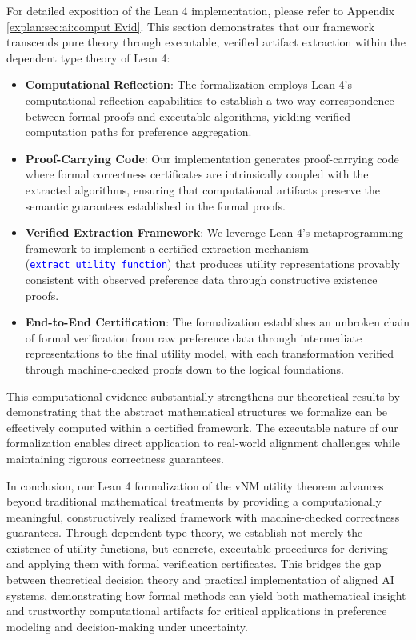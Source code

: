 \documentclass{article}
\theoremstyle{definition}
\newcommand{\tactic}[1]{\textcolor{blue}{\texttt{#1}}}
\begin{document}
For detailed exposition of the Lean 4 implementation, please refer to Appendix \ref{explan:sec:ai:comput Evid}. This section demonstrates that our framework transcends pure theory through executable, verified artifact extraction within the dependent type theory of Lean 4:

\begin{itemize}
  \item \textbf{Computational Reflection}: The formalization employs Lean 4's computational reflection capabilities to establish a two-way correspondence between formal proofs and executable algorithms, yielding verified computation paths for preference aggregation.

  \item \textbf{Proof-Carrying Code}: Our implementation generates proof-carrying code where formal correctness certificates are intrinsically coupled with the extracted algorithms, ensuring that computational artifacts preserve the semantic guarantees established in the formal proofs.

  \item \textbf{Verified Extraction Framework}: We leverage Lean 4's metaprogramming framework to implement a certified extraction mechanism (\tactic{extract\_utility\_function}) that produces utility representations provably consistent with observed preference data through constructive existence proofs.

  \item \textbf{End-to-End Certification}: The formalization establishes an unbroken chain of formal verification from raw preference data through intermediate representations to the final utility model, with each transformation verified through machine-checked proofs down to the logical foundations.
\end{itemize}

This computational evidence substantially strengthens our theoretical results by demonstrating that the abstract mathematical structures we formalize can be effectively computed within a certified framework. The executable nature of our formalization enables direct application to real-world alignment challenges while maintaining rigorous correctness guarantees.

In conclusion, our Lean 4 formalization of the vNM utility theorem advances beyond traditional mathematical treatments by providing a computationally meaningful, constructively realized framework with machine-checked correctness guarantees. Through dependent type theory, we establish not merely the existence of utility functions, but concrete, executable procedures for deriving and applying them with formal verification certificates. This bridges the gap between theoretical decision theory and practical implementation of aligned AI systems, demonstrating how formal methods can yield both mathematical insight and trustworthy computational artifacts for critical applications in preference modeling and decision-making under uncertainty.
\end{document}
